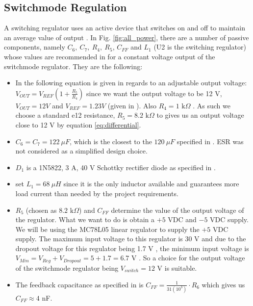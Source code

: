 \subsection{Switchmode Regulation}

 A switching regulator uses an active device that switches on and off to maintain an average value of output \cite{regulators_theory}.  In Fig. \ref{fig:all_power}, there are a number of passive components, namely $C_6,\ C_7, \ R_4, \  R_5$, $C_{FF}$ and $L_1$ (U2 is the switching regulator) whose values are recommended in \cite{TI:LM2595} for a constant voltage output of the switchmode regulator. They are the following:
\begin{itemize}
    \item In \cite{TI:LM2595} the following equation is given in regards to an adjustable output voltage: $ V_{OUT} = V_{REF}(1 + \frac{R_5}{R_4}) \label{eq:differential}$ since we want the output voltage to be 12 V, $V_{OUT} = 12 V$ and $V_{REF} = 1.23 V$ (given in \cite{TI:LM2595}). Also $R_4 = 1 \text{ k} \Omega$ . As such we choose a standard e12 resistance, $R_5 = 8.2  \text{ k} \Omega$ to gives us an output voltage close to 12 V by equation \ref{eq:differential}.
    \item $C_{6} = C_{7} = 122 \ \mu F$, which is the closest to the $120 \ \mu F$ specified in \cite{TI:LM2595}. ESR was not considered as a simplified design choice.
    \item $D_1$ is a 1N5822, 3 A, 40 V Schottky rectifier diode as specified in \cite{TI:LM2595}.
    \item set $L_1 = 68 \  \mu H$ since it is the only inductor available and guarantees more load current than needed by the project requirements.
    \item $R_5$ (chosen as $8.2  \text{ k} \Omega$) and $C_{FF}$  determine the value of the output voltage of the regulator. What we want to do is obtain a  $+5 \text{ VDC}$ and $-5 \text{ VDC}$ supply. We will be using the MC78L05 linear regulator to supply the $+5 \text{ VDC}$ supply. The maximum input voltage to this regulator is 30 V \cite{LM7805} and due to the dropout voltage for this regulator being 1.7 V \cite{LM7805}, the minimum input voltage is $V_{Min} = V_{Reg} + V_{Dropout} = 5 + 1.7 = 6.7$ V . So a choice for the output voltage of the switchmode regulator being $V_{switch} = 12$ V is suitable.
    \item  The feedback capacitance as specified in \cite{LM2595} is $ C_{FF} = \frac{1}{31(10^3)} \cdot R_6 \label{eq:cap}$ which gives us $C_{FF} \approx 4$ nF.
\end{itemize}

